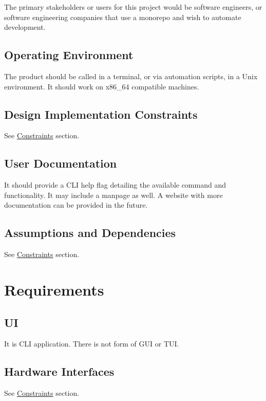 \documentclass[11pt]{article}
\begin{document}
The primary stakeholders or users for this project would be software engineers,
or software engineering companies that use a monorepo and wish to automate
development.

\subsection{Operating Environment}

The product should be called in a terminal, or via automation scripts, in a Unix
environment. It should work on x86\_64 compatible machines.

\subsection{Design Implementation Constraints}
See \hyperref[sec:constraints]{Constraints} section.

\subsection{User Documentation}

It should provide a CLI help flag detailing the available command and
functionality. It may include a manpage as well. A website with more
documentation can be provided in the future.

\subsection{Assumptions and Dependencies}

See \hyperref[sec:constraints]{Constraints} section.

\section{Requirements}
\subsection{UI}

It is CLI application. There is not form of GUI or TUI.

\subsection{Hardware Interfaces}

See \hyperref[sec:constraints]{Constraints} section.
\end{document}
